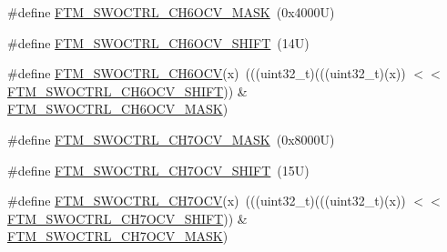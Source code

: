 \begin{DoxyCompactItemize}
\item 
\#define \mbox{\hyperlink{group___f_t_m___register___masks_ga3b9f11da0d8d83fba974c4aaba2dac8a}{F\+T\+M\+\_\+\+S\+W\+O\+C\+T\+R\+L\+\_\+\+C\+H6\+O\+C\+V\+\_\+\+M\+A\+SK}}~(0x4000\+U)
\item 
\#define \mbox{\hyperlink{group___f_t_m___register___masks_ga5f2de43ea7c9508165b8829009f2171f}{F\+T\+M\+\_\+\+S\+W\+O\+C\+T\+R\+L\+\_\+\+C\+H6\+O\+C\+V\+\_\+\+S\+H\+I\+FT}}~(14\+U)
\item 
\#define \mbox{\hyperlink{group___f_t_m___register___masks_gae60bcae6377bbb5d6e646e6c10b16489}{F\+T\+M\+\_\+\+S\+W\+O\+C\+T\+R\+L\+\_\+\+C\+H6\+O\+CV}}(x)~(((uint32\+\_\+t)(((uint32\+\_\+t)(x)) $<$$<$ \mbox{\hyperlink{group___f_t_m___register___masks_ga5f2de43ea7c9508165b8829009f2171f}{F\+T\+M\+\_\+\+S\+W\+O\+C\+T\+R\+L\+\_\+\+C\+H6\+O\+C\+V\+\_\+\+S\+H\+I\+FT}})) \& \mbox{\hyperlink{group___f_t_m___register___masks_ga3b9f11da0d8d83fba974c4aaba2dac8a}{F\+T\+M\+\_\+\+S\+W\+O\+C\+T\+R\+L\+\_\+\+C\+H6\+O\+C\+V\+\_\+\+M\+A\+SK}})
\item 
\#define \mbox{\hyperlink{group___f_t_m___register___masks_gaeb2705f6572eaf6bcf1f868c8f70f6c2}{F\+T\+M\+\_\+\+S\+W\+O\+C\+T\+R\+L\+\_\+\+C\+H7\+O\+C\+V\+\_\+\+M\+A\+SK}}~(0x8000\+U)
\item 
\#define \mbox{\hyperlink{group___f_t_m___register___masks_ga6319ffea29243485dcc140b0ef64002c}{F\+T\+M\+\_\+\+S\+W\+O\+C\+T\+R\+L\+\_\+\+C\+H7\+O\+C\+V\+\_\+\+S\+H\+I\+FT}}~(15\+U)
\item 
\#define \mbox{\hyperlink{group___f_t_m___register___masks_gaf82a5ca7281f1d3e40adb5292caae6e1}{F\+T\+M\+\_\+\+S\+W\+O\+C\+T\+R\+L\+\_\+\+C\+H7\+O\+CV}}(x)~(((uint32\+\_\+t)(((uint32\+\_\+t)(x)) $<$$<$ \mbox{\hyperlink{group___f_t_m___register___masks_ga6319ffea29243485dcc140b0ef64002c}{F\+T\+M\+\_\+\+S\+W\+O\+C\+T\+R\+L\+\_\+\+C\+H7\+O\+C\+V\+\_\+\+S\+H\+I\+FT}})) \& \mbox{\hyperlink{group___f_t_m___register___masks_gaeb2705f6572eaf6bcf1f868c8f70f6c2}{F\+T\+M\+\_\+\+S\+W\+O\+C\+T\+R\+L\+\_\+\+C\+H7\+O\+C\+V\+\_\+\+M\+A\+SK}})
\end{DoxyCompactItemize}
